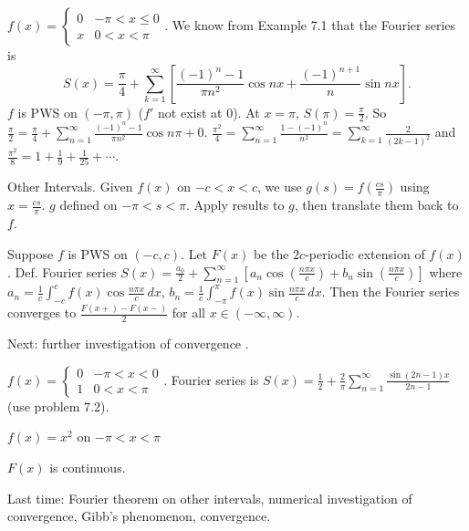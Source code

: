 \documentclass[]{article}
\begin{document}
\begin{example}
	$f(x) = \begin{cases} 0 & -\pi<x\leq 0 \\ x & 0<x<\pi \end{cases}$. We know from Example 7.1 that the Fourier series is $$S(x) = \frac{\pi}{4} + \sum_{k=1}^\infty \left[ \frac{(-1)^n-1}{\pi n^2}\cos{nx} + \frac{(-1)^{n+1}}{n}\sin{nx}\right].$$ $f$ is PWS on $(-\pi,\pi)$ ($f'$ not exist at 0). At $x=\pi$, $S(\pi) = \frac{\pi}{2}$. So $\frac{\pi}{2} = \frac{\pi}{4} + \sum_{n=1}^\infty \frac{(-1)^n-1}{\pi n^2} \cos{n\pi} + 0$. $\frac{\pi^2}{4} = \sum_{n=1}^\infty \frac{1-(-1)^n}{n^2} = \sum_{k=1}^\infty \frac{2}{(2k-1)^2}$ and $\frac{\pi^2}{8} = 1 + \frac{1}{9} + \frac{1}{25} + \cdots$.
\end{example}

Other Intervals.
Given $f(x)$ on $-c<x<c$, we use $g(s) = f\left(\frac{cs}{\pi}\right)$ using $x=\frac{cs}{\pi}$. $g$ defined on $-\pi<s<\pi$. Apply results to $g$, then translate them back to $f$.
\begin{theorem}
	Suppose $f$ is PWS on $(-c,c)$. Let $F(x)$ be the $2c$-periodic extension of $f(x)$. Def. Fourier series 
	$S(x) = \frac{a_0}{2} + \sum_{n=1}^\infty \left[ a_n \cos{\left(\frac{n\pi x}{c}\right)} + b_n \sin{\left(\frac{n\pi x}{c} \right)} \right]$  
	where $a_n = \frac{1}{c} \int_{-c}^c f(x) \cos{\frac{n\pi x}{c}} \, dx$, $b_n = \frac{1}{c} \int_{-\pi}^\pi f(x) \sin{\frac{n\pi x}{c}} \, dx$. Then the Fourier series converges to $\frac{F(x+)-F(x-)}{2}$ for all $x\in (-\infty,\infty)$.
\end{theorem}

Next: further investigation of convergence .
\begin{example}
	$f(x) = \begin{cases} 0 & -\pi<x<0 \\ 1 & 0<x<\pi \end{cases}$. Fourier series is $S(x) = \frac{1}{2} + \frac{2}{\pi} \sum_{n=1}^\infty \frac{\sin{(2n-1)x}}{2n-1}$ (use problem 7.2).
\end{example}
\begin{example}
	$f(x) = x^2 $ on $-\pi<x<\pi$
	\begin{note}
		$F(x)$ is continuous.
	\end{note}
\end{example}

Last time: Fourier theorem on other intervals, numerical investigation of convergence, Gibb's phenomenon,  convergence.
\end{document}
